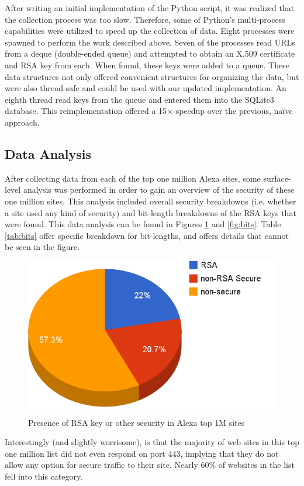 \documentclass[12pt]{ucthesis}
\begin{document}
After writing an initial implementation of the Python script, it was realized
that the collection process was too slow. Therefore, some of Python's
multi-process capabilities were utilized to speed up the collection of data.
Eight processes were spawned to perform the work described above. Seven of the
processes read URLs from a deque (double-ended queue) and attempted to obtain
an X.509 certificate and RSA key from each. When found, these keys were added
to a queue. These data structures not only offered convenient structures for
organizing the data, but were also thread-safe and could be used with our
updated implementation. An eighth thread read keys from the queue and entered
them into the SQLite3 database. This reimplementation offered a 15$\times$
speedup over the previous, na\"{i}ve approach.

\subsection{Data Analysis}
\label{datanalysis}
After collecting data from each of the top one million Alexa sites, some
surface-level analysis was performed in order to gain an overview of the
security of these one million sites. This analysis included overall security
breakdowns (i.e. whether a site used any kind of security) and
bit-length breakdowns of the RSA keys that were found. This data analysis can
be found in Figures \ref{fig:certs} and \ref{fig:bits}. Table \ref{tab:bits}
offer specific breakdown for bit-lengths, and offers details that cannot be
seen in the figure.

\begin{figure}
   \label{fig:certs}
   \centering
   \includegraphics[width=0.75\linewidth]{cert_security.png}
   \caption{Presence of RSA key or other security in Alexa top 1M sites}
\end{figure}

Interestingly (and slightly worrisome), is that the majority of web sites in
this top one million list did not even respond on port 443, implying that
they do not allow any option for secure traffic to their site. Nearly 60\% of
websites in the list fell into this category.
\end{document}
